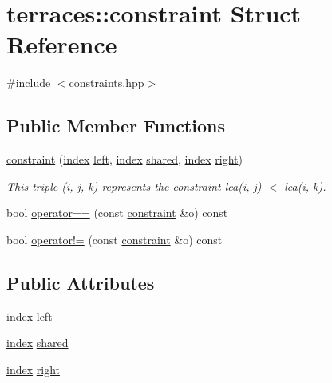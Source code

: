 \hypertarget{structterraces_1_1constraint}{}\section{terraces\+:\+:constraint Struct Reference}
\label{structterraces_1_1constraint}


{\ttfamily \#include $<$constraints.\+hpp$>$}

\subsection*{Public Member Functions}
\begin{DoxyCompactItemize}
\item 
\hyperlink{structterraces_1_1constraint_a6720264dc0ff93da5d69f3465239b070}{constraint} (\hyperlink{namespaceterraces_adbc33ccb543d1634e96d0eb02e472c77}{index} \hyperlink{structterraces_1_1constraint_a3cf21aa478cffed5ffca326814b6ced2}{left}, \hyperlink{namespaceterraces_adbc33ccb543d1634e96d0eb02e472c77}{index} \hyperlink{structterraces_1_1constraint_aa65e6eefccf91e555292f6ed34519eb8}{shared}, \hyperlink{namespaceterraces_adbc33ccb543d1634e96d0eb02e472c77}{index} \hyperlink{structterraces_1_1constraint_a649ff5f6c21e71ced0dd0c5c3cfa4be6}{right})
\begin{DoxyCompactList}\small\item\em This triple (i, j, k) represents the constraint lca(i, j) $<$ lca(i, k). \end{DoxyCompactList}\item 
bool \hyperlink{structterraces_1_1constraint_ae9645e30399ab19bd08d2cdaf67b23e9}{operator==} (const \hyperlink{structterraces_1_1constraint}{constraint} \&o) const
\item 
bool \hyperlink{structterraces_1_1constraint_afa53046f3ebfbc0855747647baec02c9}{operator!=} (const \hyperlink{structterraces_1_1constraint}{constraint} \&o) const
\end{DoxyCompactItemize}
\subsection*{Public Attributes}
\begin{DoxyCompactItemize}
\item 
\hyperlink{namespaceterraces_adbc33ccb543d1634e96d0eb02e472c77}{index} \hyperlink{structterraces_1_1constraint_a3cf21aa478cffed5ffca326814b6ced2}{left}
\item 
\hyperlink{namespaceterraces_adbc33ccb543d1634e96d0eb02e472c77}{index} \hyperlink{structterraces_1_1constraint_aa65e6eefccf91e555292f6ed34519eb8}{shared}
\item 
\hyperlink{namespaceterraces_adbc33ccb543d1634e96d0eb02e472c77}{index} \hyperlink{structterraces_1_1constraint_a649ff5f6c21e71ced0dd0c5c3cfa4be6}{right}
\end{DoxyCompactItemize}


